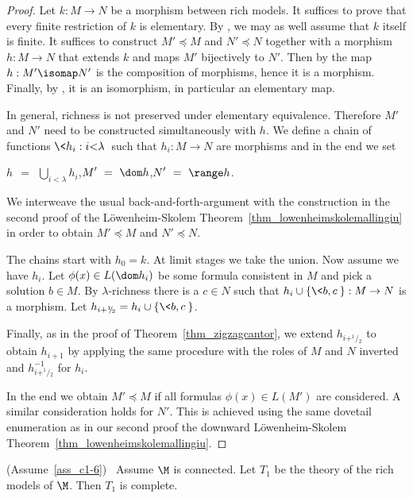 \begin{proof}
Let $k:M\to N$ be a morphism between rich models.
It suffices to prove that every finite restriction of $k$ is elementary.
By , we may as well assume that $k$ itself is finite.
It suffices to construct $M'\preceq M$ and  $N'\preceq N$ together with a morphism $h:M\to N$ that extends $k$ and maps $M'$ bijectively to $N'$.
Then by  the map $h:M'\isomap N'$ is the composition of morphisms, hence it is a morphism.
Finally, by , it is an isomorphism, in particular an elementary map.

In general, richness is not preserved under elementary equivalence.
Therefore $M'$ and $N'$ need to be constructed simultaneously with $h$.
We define a chain of functions $\<h_i:i{<}\lambda\>$ such that $h_i:M\to N$ are mor\-phisms and in the end we set

\hfil  $\displaystyle h\ \ =\ \ \bigcup_{i<\lambda}h_i$,\hfil $\displaystyle M'\ =\ \dom h$,\hfil $\displaystyle N'\ =\ \range h$.

We interweave the usual back-and-forth-argument with the construction in the second proof of the Löwenheim-Skolem Theorem~\ref{thm_lowenheimskolemallingiu} in order to obtain $M'\preceq M$ and  $N'\preceq N$.

The chains start with $h_0=k$.
At limit stages we take the union.
Now assume we have $h_i$.
Let $\phi(x)\in L(\dom h_i)$ be some formula consistent in $M$ and pick a solution $b\in M$.
By $\lambda$-richness there is a $c\in N$ such that $h_i\cup\{\<b,c\>\}:M\to N$ is a morphism.
Let $h_{i+^1\!\!/\!_2}=h_i\cup\{\<b,c\>\}$.

Finally, as in the proof of Theorem~\ref{thm_zigzagcantor}, we extend $h_{i+^1\!\!/\!_2}$ to obtain $h_{i+1}$ by applying the same procedure with the roles of $M$ and $N$ inverted and $h^{-1}_{i+^1\!\!/\!_2}$ for $h_i$.

In the end we obtain $M'\preceq M$ if all formulas $\phi(x)\in L(M')$ are considered.
A similar consideration holds for $N'$.
This is achieved using the same dovetail enumeration as in our second proof the downward Löwenheim-Skolem Theorem~\ref{thm_lowenheimskolemallingiu}.
\end{proof}

\begin{corollary}
  (Assume~\ref{ass_c1-6})  \  Assume $\M$ is connected.
  Let $T_1$ be the theory of the rich models of $\M$.
  Then $T_1$ is complete.
\end{corollary}

